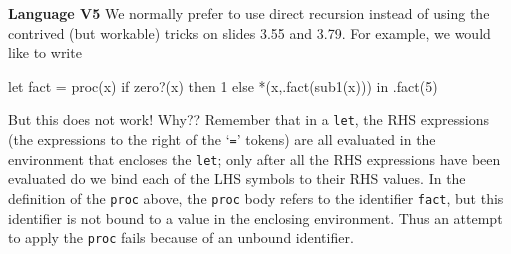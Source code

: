 \begin{minipage}[t]{\sw}
\slidenumber
\LARGE
{\bf Language V5}\exx
We normally prefer to use direct recursion instead
of using the contrived (but workable) tricks on slides 3.55 and 3.79.
For example, we would like to write
\Large
\begin{qv}
let
  fact = proc(x) if zero?(x) then 1 else *(x,.fact(sub1(x)))
in
  .fact(5)
\end{qv}
\LARGE
But this does not work!  Why??\exx
Remember that in a \verb'let',
the RHS expressions
(the expressions to the right of the `\verb'='' tokens)
are all evaluated
in the environment that encloses the \verb'let';
only after all the RHS expressions have been evaluated
do we bind each of the LHS symbols to their RHS values.\exx
In the definition of the \verb'proc' above,
the \verb'proc' body refers to the identifier \verb'fact',
but this identifier is not bound to a value
in the enclosing environment.
Thus an attempt to apply the \verb'proc'
fails because of an unbound identifier.
\end{minipage}
